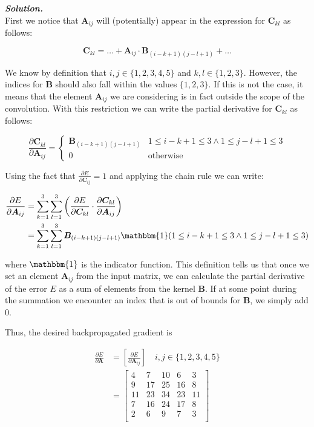 \documentclass{article}
\newcommand{\matr}[1]{\bm{#1}}     %
\begin{document}
 \textbf{\textit{Solution.}} \\
First we notice that $\matr{A}_{ij}$ will (potentially) appear in the expression for $\matr{C}_{kl}$ as follows:

\begin{equation*}
    \matr{C}_{kl} = \ldots + \matr{A}_{ij} \cdot \matr{B}_{(i-k+1)(j-l+1)} + \ldots
\end{equation*}

We know by definition that $i,j\in\{1,2,3,4,5\}$ and $k,l\in\{1,2,3\}$. However, the indices for $\matr{B}$ should also fall within the values $\{1,2,3\}$. If this is not the case, it means that the element $\matr{A}_{ij}$ we are considering is in fact outside the scope of the convolution. With this restriction we can write the partial derivative for $\matr{C}_{kl}$ as follows:

\begin{equation*}
    \frac{\partial \matr{C}_{kl}}{\partial \matr{A}_{ij}} = 
    \begin{cases} 
      \matr{B}_{(i-k+1)(j-l+1)} & 1 \leq i-k+1 \leq 3 \land 1 \leq j-l+1 \leq 3 \\
      0 & \text{otherwise}
   \end{cases}
\end{equation*}

Using the fact that $\frac{\partial E}{\partial \matr{C}_{ij}} = 1$ and applying the chain rule we can write:

\begin{align*}
    \frac{\partial E}{\partial \matr{A}_{ij}} &= \sum_{k=1}^3 \sum_{l=1}^3 \left( \frac{\partial E}{\partial \matr{C}_{kl}} \cdot \frac{\partial \matr{C}_{kl}}{\partial \matr{A}_{ij}} \right) \\
    &= \sum_{k=1}^3 \sum_{l=1}^3 \matr{B}_{(i-k+1)(j-l+1)} \mathbbm{1}(1 \leq i-k+1 \leq 3 \land 1 \leq j-l+1 \leq 3)
\end{align*}

where $\mathbbm{1}$ is the indicator function. This definition tells us that once we set an element $\matr{A}_{ij}$ from the input matrix, we can calculate the partial derivative of the error $E$ as a sum of elements from the kernel $\matr{B}$. If at some point during the summation we encounter an index that is out of bounds for $\matr{B}$, we simply add $0$.

Thus, the desired backpropagated gradient is

\begin{align*}
    \frac{\partial E}{\partial \bm{A}} &= \left[ \frac{\partial E}{\partial \matr{A}_{ij}} \right] \quad i,j\in\{1,2,3,4,5\} \\
                &= \begin{bmatrix}
                    4 & 7 & 10 & 6 & 3 \\
                    9 & 17 & 25 & 16 & 8 \\
                    11 & 23 & 34 & 23 & 11 \\
                    7 & 16 & 24 & 17 & 8 \\
                    2 & 6 & 9 & 7 & 3 \\
                \end{bmatrix}
\end{align*}
 
\end{document}
